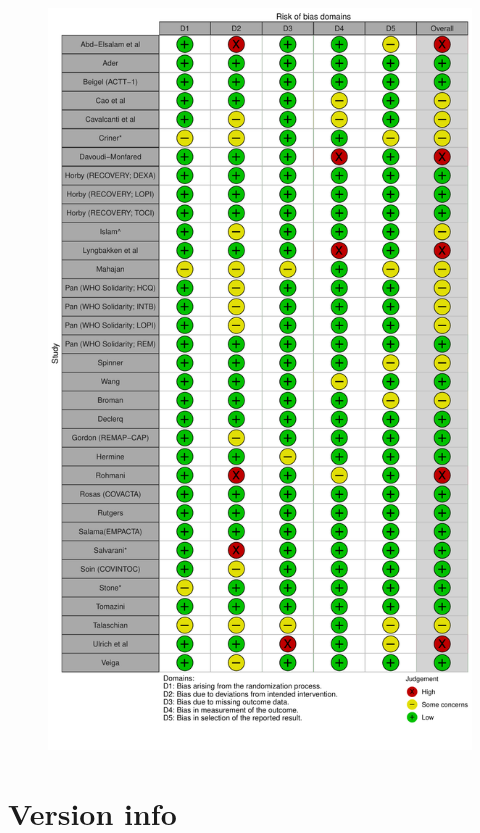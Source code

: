 \documentclass[
  letterpaper,
  DIV=11,
  numbers=noendperiod]{scrreprt}
\begin{document}
\begin{figure}[H]

{\centering \includegraphics{chapter_03_files/figure-pdf/unnamed-chunk-2-1.pdf}

}

\end{figure}

\hypertarget{version-info}{%
\section*{Version info}\label{version-info}}
\end{document}

